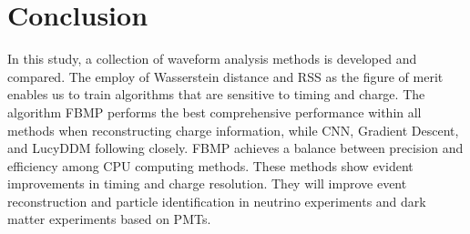 \section{Conclusion}
\label{sec:conclusion}

In this study, a collection of waveform analysis methods is developed and compared. The employ of Wasserstein distance and RSS as the figure of merit enables us to train algorithms that are sensitive to timing and charge. The algorithm FBMP performs the best comprehensive performance within all methods when reconstructing charge information, while CNN, Gradient Descent, and LucyDDM following closely. FBMP achieves a balance between precision and efficiency among CPU computing methods. These methods show evident improvements in timing and charge resolution. They will improve event reconstruction and particle identification in neutrino experiments and dark matter experiments based on PMTs. 
